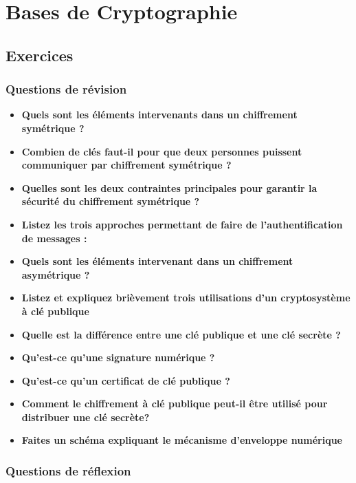 \documentclass{report}
\begin{document}

\chapter{Bases de Cryptographie}
	
	\section{Exercices}

		\subsection{Questions de révision}

			\begin{itemize}
				\item \textbf{Quels sont les éléments intervenants dans un chiffrement symétrique ?}
				\item \textbf{Combien de clés faut-il pour que deux personnes puissent communiquer par chiffrement symétrique ?}
				\item \textbf{Quelles sont les deux contraintes principales pour garantir la sécurité du chiffrement symétrique ?}
				\item \textbf{Listez les trois approches permettant de faire de l'authentification de messages :}
				\item \textbf{Quels sont les éléments intervenant dans un chiffrement asymétrique ?}
				\item \textbf{Listez et expliquez brièvement trois utilisations d'un cryptosystème à clé publique}
				\item \textbf{Quelle est la différence entre une clé publique et une clé secrète ?}
				\item \textbf{Qu'est-ce qu'une signature numérique ?}
				\item \textbf{Qu'est-ce qu'un certificat de clé publique ?}
				\item \textbf{Comment le chiffrement à clé publique peut-il être utilisé pour distribuer une clé secrète?}
				\item \textbf{Faites un schéma expliquant le mécanisme d'enveloppe numérique}
			\end{itemize}

		\subsection{Questions de réflexion}
\end{document}
